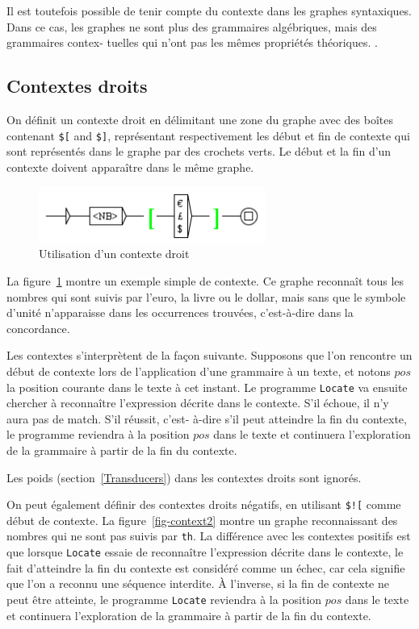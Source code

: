 \bigskip
\noindent Il est toutefois possible de tenir compte du contexte dans les graphes syntaxiques. Dans
ce cas, les graphes ne sont plus des grammaires algébriques, mais des grammaires contex-
tuelles qui n’ont pas les mêmes propriétés théoriques.
.

\subsection{Contextes droits}
\index{\verbc{$[}}
\index{\verbc{$]}}
On définit un contexte droit en délimitant une zone du graphe avec des boîtes contenant
\verb+$[+ and \verb+$]+, représentant respectivement les début et fin de contexte qui sont
représentés dans le graphe par des crochets verts. Le début et la fin d’un contexte doivent
apparaître dans le même graphe.


\bigskip
\begin{figure}[!ht]
\begin{center}
\includegraphics[width=7.4cm]{resources/img/fig6-12.png}
\caption{Utilisation d’un contexte droit\label{fig-context1}}
\end{center}
\end{figure}

\bigskip
\noindent La figure~\ref{fig-context1} montre un exemple simple de contexte. Ce graphe
reconnaît tous les nombres qui sont suivis par l’euro, la livre ou le dollar, mais sans
que le symbole d’unité n’apparaisse dans les occurrences trouvées, c'est-à-dire dans
la concordance.

\bigskip
\noindent Les contextes s’interprètent de la façon suivante. Supposons que l’on rencontre un début
de contexte lors de l’application d’une grammaire à un texte, et notons $pos$ la position courante
dans le texte à cet instant. Le programme \verb$Locate$ va ensuite chercher à reconnaître
l’expression décrite dans le contexte. S’il échoue, il n’y aura pas de match. S’il réussit, c’est-
à-dire s’il peut atteindre la fin du contexte, le programme reviendra à la position $pos$ dans
le texte et continuera l’exploration de la grammaire à partir de la fin du contexte.

\bigskip
\noindent Les poids (section~\ref{Transducers}) dans les contextes droits sont ignorés.

\bigskip
\noindent On peut également définir des contextes droits négatifs, en utilisant
 \verb+$![+ comme début de contexte. La figure~\ref{fig-context2}
montre un graphe reconnaissant des nombres qui ne sont pas suivis par \verb+th+.
 La différence avec les contextes positifs est que lorsque \verb$Locate$ essaie de reconnaître
 l’expression décrite dans le contexte, le fait d’atteindre la fin du
 contexte est considéré comme un échec, car cela signifie que l’on a reconnu une séquence interdite.
 À l’inverse, si la fin de contexte ne peut être atteinte, le programme \verb$Locate$ reviendra à
 la position $pos$ dans le texte et continuera l’exploration de la grammaire à partir de la fin du
 contexte.

